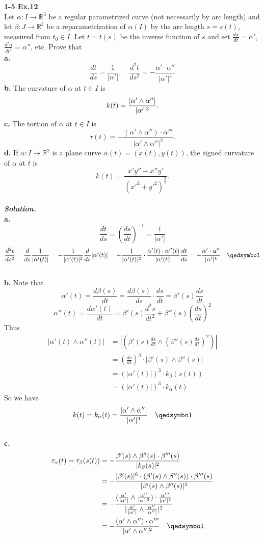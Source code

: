 \documentclass{article}
\begin{document}
\par
\textbf{1-5 Ex.12}\\
Let $\alpha: I \to \mathbb{R}^3$ be a regular parametrized curve (not necessarily by arc length) and let $\beta: J \to \mathbb{R}^3$ be
a reparametrization of $\alpha(I)$ by the arc length $s = s(t)$, measured from $t_0 \in I$. Let $t = t(s)$
be the inverse function of $s$ and set $\frac{d\alpha}{dt}=\alpha'$, $\frac{d^2\alpha}{dt^2}=\alpha''$, etc.
Prove that\\
\textbf{a. }
$$
    \frac{dt}{ds}=\frac{1}{|\alpha'|}, \quad \frac{d^2t}{ds^2} = -\frac{\alpha' \cdot \alpha''}{|\alpha'|^4}
$$
\textbf{b. }The curvature of $\alpha$ at $t \in I$ is 
$$
    k(t) = \frac{|\alpha' \wedge \alpha''|}{|\alpha'|^3}.\\
$$
\textbf{c. }The tortion of $\alpha$ at $t \in I$ is
$$
    \tau(t) = - \frac{(\alpha' \wedge \alpha'') \cdot \alpha'''}{|\alpha' \wedge \alpha''|^2}.
$$
\textbf{d. }If $\alpha: I \to \mathbb{R}^2$ is a plane curve $\alpha(t) = (x(t), y(t))$, the signed curvature
of $\alpha$ at $t$ is
$$
    k(t) = \frac{x'y'' - x''y'}{(x'^2 + y'^2)^{\frac{3}{2}}}.
$$
\\
\textbf{\textit{Solution.}}\\
\textbf{a. }
$$
    \frac{dt}{ds} = (\frac{ds}{dt})^{-1} = \frac{1}{|\alpha'|}
$$
$$
    \frac{d^2t}{ds^2} = \frac{d}{ds} \frac{1}{|\alpha'(t)|} = -\frac{1}{|\alpha'(t)|^2} \frac{d}{ds}|\alpha'(t)| 
    = -\frac{1}{|\alpha'(t)|^2} \cdot \frac{\alpha'(t) \cdot \alpha''(t)}{|\alpha'(t)|} \frac{dt}{ds} = - \frac{\alpha' \cdot \alpha''}{|\alpha'|^4} \quad \qedsymbol
$$
\\
\textbf{b. } Note that
$$
    \alpha'(t) = \frac{d\beta(s)}{dt} = \frac{d\beta(s)}{ds}\cdot \frac{ds}{dt} = \beta'(s)\frac{ds}{dt}
$$
$$
    \alpha''(t) = \frac{d\alpha'(t)}{dt} = \beta'(s)\frac{d^2s}{dt^2} + \beta''(s)(\frac{ds}{dt})^2
$$
Thus
$$
\begin{aligned}
    |\alpha'(t) \wedge \alpha''(t)| &= |(\beta'(s)\frac{ds}{dt} \wedge (\beta''(s)\frac{ds}{dt})^2)| \\
    &= (\frac{ds}{dt})^3 \cdot |\beta'(s) \wedge \beta''(s)|\\
    &= (|\alpha'(t)|)^3 \cdot k_{\beta}(s(t)) \\
    &= (|\alpha'(t)|)^3 \cdot k_{\alpha}(t)
\end{aligned}
$$
So we have
$$
    k(t) = k_{\alpha}(t) = \frac{|\alpha' \wedge \alpha''|}{|\alpha'|^3} \quad \qedsymbol
$$
\\
\textbf{c. }
$$
\begin{aligned}
    \tau_{\alpha}(t) = \tau_{\beta}(s(t)) &=-\frac{\beta'(s) \wedge \beta''(s) \cdot \beta'''(s)}{|k_{\beta}(s)|^2}\\
    &= -\frac{|\beta'(s)|^6 \cdot (\beta'(s) \wedge \beta''(s)) \cdot \beta'''(s)}{|\beta'(s) \wedge \beta''(s)|^2}\\
    &= -\frac{(\frac{\alpha'}{|\alpha'|} \wedge \frac{\alpha''}{|\alpha'|^2}) \cdot \frac{\alpha'''}{|\alpha'|^3}}{|\frac{\alpha'}{|\alpha'|} \wedge \frac{\alpha''}{|\alpha''|}|^2}\\
    &= -\frac{(\alpha' \wedge \alpha'') \cdot \alpha'''}{|\alpha' \wedge \alpha''|^2} \quad \qedsymbol
\end{aligned}
$$
\end{document}
